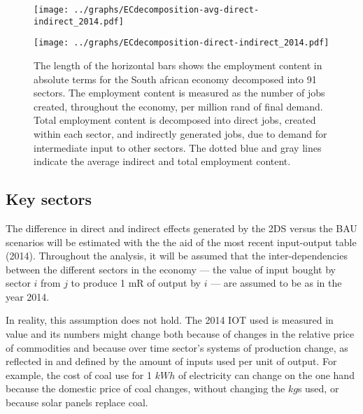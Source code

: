 \documentclass[12pt,english]{article}
\begin{document}
\begin{figure}[!ht]
	\centering
	\thispagestyle{empty}
		\texttt{[image: ../graphs/ECdecomposition-avg-direct-indirect\_2014.pdf]}
	\caption{\label{Decomposition_direct_indirect_avg}}
\end{figure}	



\begin{figure}[!ht]
	\centering
	\thispagestyle{empty}
		\texttt{[image: ../graphs/ECdecomposition-direct-indirect\_2014.pdf]}
	\caption{\label{Decomposition_direct_indirect_absolute} The length of the horizontal bars shows the employment content in absolute terms for the South african economy decomposed into 91 sectors. The employment content is measured as the number of jobs created, throughout the economy, per million rand of final demand. Total employment content is decomposed into direct jobs, created within each sector, and indirectly generated jobs, due to demand for intermediate input to other sectors. The dotted blue and gray lines indicate the average indirect and total employment content.}
\end{figure}	

\clearpage

\subsection{Key sectors}
The difference in direct and indirect effects generated by the 2DS versus the BAU scenarios will be estimated with the the aid of the most recent input-output table (2014). Throughout the analysis, it will be assumed that the inter-dependencies between the different sectors in the economy --- the value of input bought by sector $i$ from $j$ to produce 1 mR of output by $i$ --- are assumed to be as in the year 2014. %

In reality, this assumption does not hold. The 2014 IOT used is measured in value and its numbers might change both because of changes in the relative price of commodities and because over time sector's systems of production change, as reflected in and defined by the amount of inputs used per unit of output. For example, the cost of coal use for 1 $kWh$ of electricity can change on the one hand because the domestic price of coal changes, without changing the $kg$s used, or because solar panels replace coal.
\end{document}
